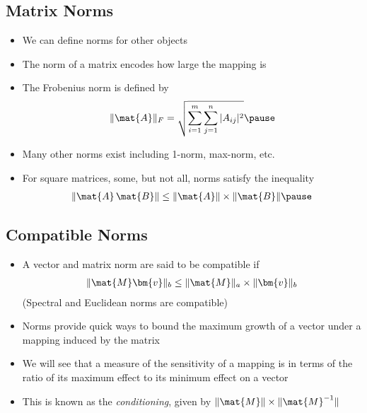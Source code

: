 \begin{slide}
\section[-2]{Matrix Norms}

\begin{PauseHighLight}
  \begin{itemize}
  \item We can define norms for other objects\pause
  \item The norm of a matrix encodes how large the mapping is\pause
  \item The Frobenius norm is defined by
    \begin{align*}
      \| \mat{A} \|_F = \sqrt{\sum_{i=1}^m \sum_{j=1}^n |A_{ij}|^2}\pause
    \end{align*}
  \item Many other norms exist including 1-norm, max-norm, etc.\pause
  \item For square matrices, some, but not all, norms satisfy the
    inequality
    \begin{align*}
      \| \mat{A}\,\mat{B} \| \leq \| \mat{A} \| \times \| \mat{B} \|\pause
    \end{align*}
  \end{itemize}
\end{PauseHighLight}

\end{slide}


\begin{slide}
\section[-2]{Compatible Norms}

\begin{PauseHighLight}
  \begin{itemize}
  \item A vector and matrix norm are said to be compatible if
    \begin{align*}
      \| \mat{M} \bm{v} \|_b \leq \| \mat{M} \|_a \times \| \bm{v} \|_b
    \end{align*}
    (Spectral and Euclidean norms are compatible)\pause
  \item Norms provide quick ways to bound the maximum growth of a vector
    under a mapping induced by the matrix\pause
  \item We will see that a measure of the sensitivity of a mapping is in
    terms of the ratio of its maximum effect to its minimum effect on a
    vector\pause
  \item This is known as the \emph{conditioning}, given by
    $\|\mat{M}\| \times \|\mat{M}^{-1}\|$\pause
  \end{itemize}
\end{PauseHighLight}


\end{slide}


